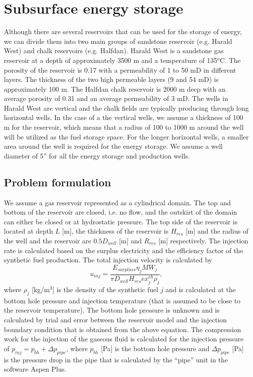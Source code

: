 \documentclass{ECOS_2021}
\begin{document}
\sffamily \section{Subsurface energy storage}
\normalsize
Although there are several reservoirs that can be used for the storage
of energy, we can divide them into two main groups of sandstone reservoir
(e.g. Harald West) and chalk reservoirs (e.g. Halfdan). Harald West
is a sandstone gas reservoir at a depth of approximately 3500 m and
a temperature of 135$^{o}$C. The porosity of the reservoir is 0.17
with a permeability of 1 to 50 mD in different layers. The thickness
of the two high permeable layers (9 and 54 mD) is approximately 100
m. The Halfdan chalk reservoir is 2000 m deep with an average porosity
of 0.31 and an average permeability of 3 mD. The wells in Harald West
are vertical and the chalk fields are typically producing through
long horizontal wells. In the case of a the vertical wells, we assume
a thickness of 100 m for the reservoir, which means that a radius
of 100 to 1000 m around the well will be utilized as the fuel storage
space. For the longer horizontal wells, a smaller area around the
well is required for the energy storage. We assume a well diameter
of 5'' for all the energy storage and production wells. 

\sffamily \subsection{Problem formulation}
\normalsize
We assume a gas reservoir represented
as a cylindrical domain. The top and bottom of the reservoir are closed,
i.e. no flow, and the outskirt of the domain can either be closed
or at hydrostatic pressure. The top side of the reservoir is located
at depth $L$ {[}m{]}, the thickness of the reservoir is $H_{res}$
{[}m{]} and the radius of the well and the reservoir are $0.5D_{well}$
{[}m{]} and $R_{res}$ {[}m{]} respectively. The injection rate is
calculated based on the surplus electricity and the efficiency factor
of the synthetic fuel production. The total injection
velocity is calculated by
\[
u_{inj}=\frac{E_{surpluss}\eta_{j}MW_{j}}{\pi D_{well}H_{res}ex_{j}^{ch}\rho_{j}},
\]
where $\rho_{j}$ {[}kg/m$^{3}${]} is the density of the synthetic
fuel $j$ and is calculated at the bottom hole pressure and injection
temperature (that is assumed to be close to the reservoir temperature).
The bottom hole pressure is unknown and is calculated by trial and
error between the reservoir model and the injection boundary condition
that is obtained from the above equation. The compression work
for the injection of the gaseous fluid is calculated for the injection
pressure of $p_{inj}=p_{bh}+\Delta p_{pipe}$, where $p_{bh}$ {[}Pa{]}
is the bottom hole pressure and $\Delta p_{pipe}$ {[}Pa{]} is the
pressure drop in the pipe that is calculated by the ``pipe'' unit
in the software Aspen Plus.
\end{document}
